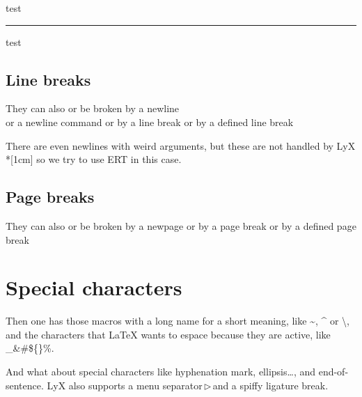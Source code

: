 \documentclass[a4paper,12pt]{article}
\newcommand{\lyxline}[1][1pt]{%
  \par\noindent%
  \rule[.5ex]{\linewidth}{#1}\par}
\newcommand{\lyxarrow}{\leavevmode\,$\triangleright$\,\allowbreak}
\begin{document}
test

{\Huge \lyxline{\Huge}}{\Huge \par}

test

\subsection{Line breaks}

They can also or be broken by a newline\\
or a newline command \newline
or by a line break \linebreak
or by a defined line break \linebreak[4]

There are even newlines with weird arguments, but these are not
handled by LyX\\*[1cm]
so we try to use ERT in this case.

\subsection{Page breaks}

They can also or be broken by a newpage \newpage
or by a page break \pagebreak
or by a defined page break \pagebreak[4]

\section{Special characters}

Then one has those macros with a long name for a short meaning, like
\textasciitilde, \textasciicircum{} or \textbackslash{}, and the characters
that LaTeX wants to espace because they are active, like \_\&\#\$\{\}\%.

And what about special characters like hyphe\-nation mark,
ellipsis\ldots, and end-of-sentence\@. LyX also supports a menu
separator\lyxarrow{}and a spif\textcompwordmark{}fy ligature break.
\end{document}
